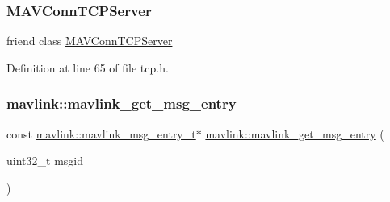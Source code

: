 \subsubsection{\texorpdfstring{MAVConnTCPServer}{MAVConnTCPServer}}
{\footnotesize\ttfamily friend class \mbox{\hyperlink{classmavconn_1_1MAVConnTCPServer}{M\+A\+V\+Conn\+T\+C\+P\+Server}}\hspace{0.3cm}{\ttfamily [friend]}}



Definition at line 65 of file tcp.\+h.

\mbox{\label{group__mavconn_gabc1b20a1cf82d2e9d432f0a5ac140630}} 
\subsubsection{\texorpdfstring{mavlink::mavlink\_get\_msg\_entry}{mavlink::mavlink\_get\_msg\_entry}}
{\footnotesize\ttfamily const \mbox{\hyperlink{include__v2_80_2mavlink__types_8h_abf009bf897407a543e5209298ad82321}{mavlink\+::mavlink\+\_\+msg\+\_\+entry\+\_\+t}}$\ast$ \mbox{\hyperlink{group__mavconn_ga5729c8752b868b9b15dc7154a66c4a14}{mavlink\+::mavlink\+\_\+get\+\_\+msg\+\_\+entry}} (\begin{DoxyParamCaption}\item[{uint32\+\_\+t}]{msgid }\end{DoxyParamCaption})\hspace{0.3cm}{\ttfamily [friend]}}

